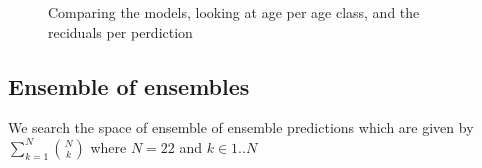 \documentclass[10pt,letterpaper]{article}
\begin{document}
\begin{figure}
  \centering

  
  \caption{\label{ref_label_overall}Comparing the models, looking at age per age class, and the reciduals per perdiction}
\end{figure}


\subsection*{Ensemble of ensembles}

We search the space of ensemble of ensemble predictions
which are given by 
$\sum_{k=1}^{N}\binom{N}{k} $ where $N=22$ and $k \in 1..N$
\end{document}
